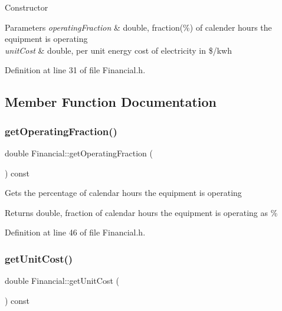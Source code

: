 Constructor 
\begin{DoxyParams}{Parameters}
{\em operating\+Fraction} & double, fraction(\%) of calender hours the equipment is operating \\
\hline
{\em unit\+Cost} & double, per unit energy cost of electricity in \$/kwh \\
\hline
\end{DoxyParams}


Definition at line 31 of file Financial.\+h.



\subsection{Member Function Documentation}
\mbox{\label{class_financial_a650ee2678b49d8d19b541f15d5a37c05}} 
\subsubsection{\texorpdfstring{get\+Operating\+Fraction()}{getOperatingFraction()}}
{\footnotesize\ttfamily double Financial\+::get\+Operating\+Fraction (\begin{DoxyParamCaption}{ }\end{DoxyParamCaption}) const\hspace{0.3cm}{\ttfamily [inline]}}

Gets the percentage of calendar hours the equipment is operating

\begin{DoxyReturn}{Returns}
double, fraction of calendar hours the equipment is operating as \% 
\end{DoxyReturn}


Definition at line 46 of file Financial.\+h.

\mbox{\label{class_financial_adc3092e8f4cfd065042638236d21eaf4}} 
\subsubsection{\texorpdfstring{get\+Unit\+Cost()}{getUnitCost()}}
{\footnotesize\ttfamily double Financial\+::get\+Unit\+Cost (\begin{DoxyParamCaption}{ }\end{DoxyParamCaption}) const\hspace{0.3cm}{\ttfamily [inline]}}

